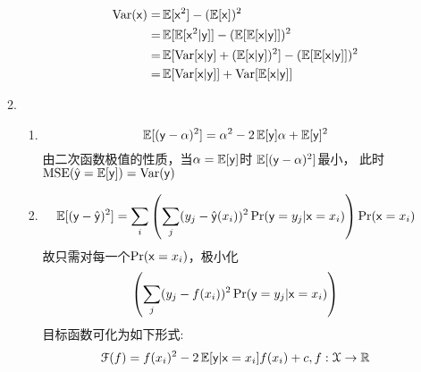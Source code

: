 \documentclass[a4paper]{article}
\begin{document}
\begin{enumerate}[label=\thehwcnt.\arabic*.]
\begin{enumerate}[label=(\alph*)]
\begin{enumerate}[label=\roman*.]
        \begin{align*}
        \Var(\rvx)=& \E[\rvx^2]-(\E[\rvx])^2\\
        =& \E[\E[\rvx^2|\rvy]]-(\E[\E[\rvx|\rvy]])^2\\
        =& \E[\Var[\rvx|\rvy]+(\E[\rvx|\rvy])^2]-(\E[\E[\rvx|\rvy]])^2\\
        =& \E[\Var[\rvx|\rvy]]+\Var[\E[\rvx|\rvy]]\\
        \end{align*}      
    \end{enumerate}
    \item 
      \begin{enumerate}[label=\roman*.]
        \item
            \begin{equation}
            \E[(\rvy-\alpha)^2]=\alpha^2-2\E[\rvy]\alpha+\E[\rvy]^2
            \end{equation}
            由二次函数极值的性质，当$\alpha=\E[\rvy]$时 $\E[(\rvy-\alpha)^2]$最小，
            此时$\MSE(\hat{\rvy}=\E[\rvy])=\Var(\rvy)$
        \item
            \begin{equation}\label{eq:P11bii}
            \E[(\rvy-\hat{\rvy})^2]=\sum_{i}\left(\sum_j (y_j-\hat{\rvy}(x_i))^2\Pr(\rvy=y_j|\rvx=x_i)\right)\Pr(\rvx=x_i)
            \end{equation}
            故只需对每一个$\Pr(\rvx=x_i)$，极小化
            \begin{equation}
            \left(\sum_j (y_j-f(x_i))^2\Pr(\rvy=y_j|\rvx=x_i)\right)
            \end{equation}
            目标函数可化为如下形式:
            \begin{equation}
            \mathcal{F}(f)=f(x_i)^2-2\E[\rvy|\rvx=x_i]f(x_i)+c,f:\mathcal{X}\rightarrow \mathbb{R}
            \end{equation}


\end{enumerate}
\end{enumerate}
\end{enumerate}
\end{document}
